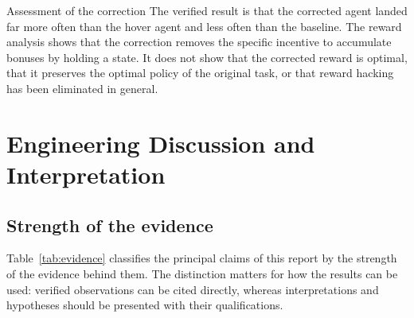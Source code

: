 \documentclass[11pt,a4paper]{article}
\begin{document}
\begin{keybox}{Assessment of the correction}
The verified result is that the corrected agent landed far more often than the hover agent and less often than the baseline. The reward analysis shows that the correction removes the specific incentive to accumulate bonuses by holding a state. It does not show that the corrected reward is optimal, that it preserves the optimal policy of the original task, or that reward hacking has been eliminated in general.
\end{keybox}

\section{Engineering Discussion and Interpretation}\label{sec:discussion}

\subsection{Strength of the evidence}

Table~\ref{tab:evidence} classifies the principal claims of this report by the strength of the evidence behind them. The distinction matters for how the results can be used: verified observations can be cited directly, whereas interpretations and hypotheses should be presented with their qualifications.
\end{document}
